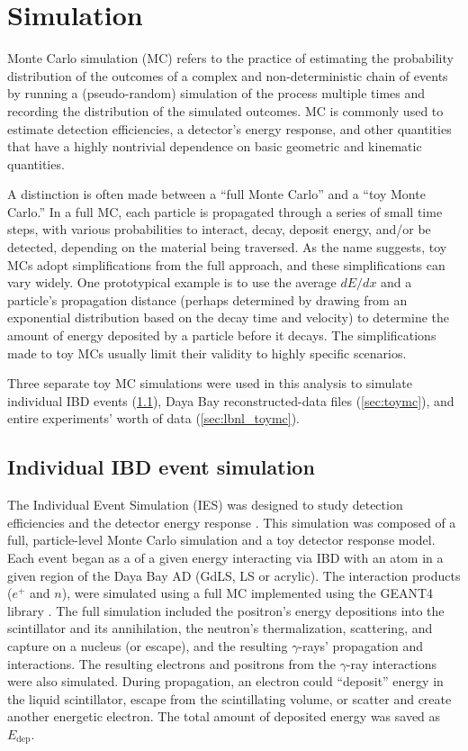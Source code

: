\chapter{Simulation}
\label{ch:simulation}

Monte Carlo simulation (MC) refers to the practice
of estimating the probability distribution of the outcomes
of a complex and non-deterministic chain of events
by running a (pseudo-random) simulation of the process multiple times
and recording the distribution of the simulated outcomes.
MC is commonly used to estimate detection efficiencies,
a detector's energy response,
and other quantities that have a highly nontrivial dependence
on basic geometric and kinematic quantities.

A distinction is often made between a ``full Monte Carlo''
and a ``toy Monte Carlo.''
In a full MC, each particle is propagated through a series of small time steps,
with various probabilities to interact, decay, deposit energy, and/or be detected,
depending on the material being traversed.
As the name suggests, toy MCs adopt simplifications from the full approach,
and these simplifications can vary widely.
One prototypical example is to use the average $dE/dx$
and a particle's propagation distance
(perhaps determined by drawing from an exponential distribution
based on the decay time and velocity)
to determine the amount of energy deposited by a particle
before it decays.
The simplifications made to toy MCs usually limit their validity
to highly specific scenarios.

Three separate toy MC simulations were used in this analysis
to simulate individual IBD events (\cref{sec:thu_toymc}),
Daya Bay reconstructed-data files (\cref{sec:toymc}),
and entire experiments' worth of data (\cref{sec:lbnl_toymc}).

\section{Individual IBD event simulation}
\label{sec:thu_toymc}

The Individual Event Simulation (IES) was designed
to study detection efficiencies and the detector energy response \cite{nh2016technote}.
This simulation was composed of a full, particle-level Monte Carlo simulation
and a toy detector response model.
Each event began as a \nuebar{} of a given energy interacting via IBD
with an atom in a given region of the Daya Bay AD
(GdLS, LS or acrylic).
The interaction products ($e^+$ and $n$),
were simulated using a full MC implemented using the GEANT4 library \cite{geant4}.
The full simulation included
the positron's energy depositions into the scintillator
and its annihilation,
the neutron's thermalization, scattering, and capture on a nucleus (or escape),
and the resulting $\gamma$-rays' propagation and interactions.
The resulting electrons and positrons from the $\gamma$-ray interactions
were also simulated.
During propagation, an electron could
``deposit'' energy in the liquid scintillator,
escape from the scintillating volume,
or scatter and create another energetic electron.
The total amount of deposited energy was saved as $E_{\text{dep}}$.

